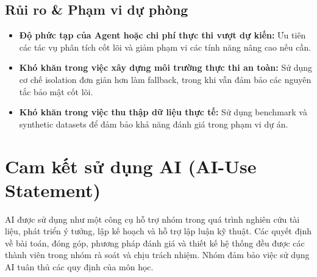 \subsection{Rủi ro \& Phạm vi dự phòng}

\begin{itemize}
\item \textbf{Độ phức tạp của Agent hoặc chi phí thực thi vượt dự kiến:} Ưu tiên các tác vụ phân tích cốt lõi và giảm phạm vi các tính năng nâng cao nếu cần.

\item \textbf{Khó khăn trong việc xây dựng môi trường thực thi an toàn:} Sử dụng cơ chế isolation đơn giản hơn làm fallback, trong khi vẫn đảm bảo các nguyên tắc bảo mật cốt lõi.

\item \textbf{Khó khăn trong việc thu thập dữ liệu thực tế:} Sử dụng benchmark và synthetic datasets để đảm bảo khả năng đánh giá trong phạm vi dự án.

\end{itemize}

\section{Cam kết sử dụng AI (AI-Use Statement)}

AI được sử dụng như một công cụ hỗ trợ nhóm trong quá trình nghiên cứu tài liệu, phát triển ý tưởng, lập kế hoạch và hỗ trợ lập luận kỹ thuật. Các quyết định về bài toán, đóng góp, phương pháp đánh giá và thiết kế hệ thống đều được các thành viên trong nhóm rà soát và chịu trách nhiệm. Nhóm đảm bảo việc sử dụng AI tuân thủ các quy định của môn học.